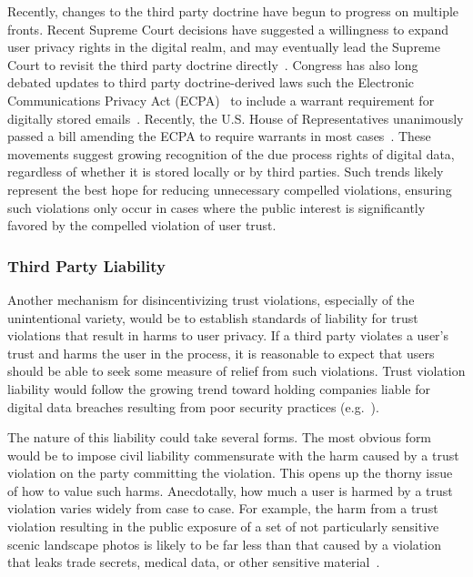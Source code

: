 Recently, changes to the third party doctrine have begun to progress
on multiple fronts. Recent Supreme Court decisions have suggested a
willingness to expand user privacy rights in the digital realm, and
may eventually lead the Supreme Court to revisit the third party
doctrine directly~\cite{scotus-usvjones}.  Congress has also long
debated updates to third party doctrine-derived laws such the
Electronic Communications Privacy Act (ECPA)~\cite{ecpa} to include a
warrant requirement for digitally stored
emails~\cite{eff-ecpareform}. Recently, the U.S. House of
Representatives unanimously passed a bill amending the ECPA to require
warrants in most cases~\cite{trujillo-ecpa}. These movements suggest
growing recognition of the due process rights of digital data,
regardless of whether it is stored locally or by third parties. Such
trends likely represent the best hope for reducing unnecessary
compelled violations, ensuring such violations only occur in cases
where the public interest is significantly favored by the compelled
violation of user trust.

\subsubsection{Third Party Liability}

Another mechanism for disincentivizing trust violations, especially of
the unintentional variety, would be to establish standards of
liability for trust violations that result in harms to user
privacy. If a third party violates a user's trust and harms the user
in the process, it is reasonable to expect that users should be able
to seek some measure of relief from such violations. Trust violation
liability would follow the growing trend toward holding companies
liable for digital data breaches resulting from poor security
practices (e.g.~\cite{ftc-asus}).

The nature of this liability could take several forms. The most
obvious form would be to impose civil liability commensurate with the
harm caused by a trust violation on the party committing the
violation. This opens up the thorny issue of how to value such
harms. Anecdotally, how much a user is harmed by a trust violation
varies widely from case to case. For example, the harm from a trust
violation resulting in the public exposure of a set of not
particularly sensitive scenic landscape photos is likely to be far
less than that caused by a violation that leaks trade secrets, medical
data, or other sensitive material~\cite{acquisti2013, romanosky2009}.

